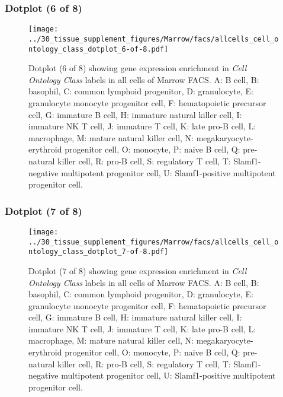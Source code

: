 \subsubsection{Dotplot (6 of 8)}
\begin{figure}[h]
\centering
\texttt{[image: ../30\_tissue\_supplement\_figures/Marrow/facs/allcells\_cell\_ontology\_class\_dotplot\_6-of-8.pdf]}

\caption{ Dotplot (6 of 8)  showing gene expression enrichment in \emph{Cell Ontology Class} labels in all cells of Marrow FACS. A: B cell, B: basophil, C: common lymphoid progenitor, D: granulocyte, E: granulocyte monocyte progenitor cell, F: hematopoietic precursor cell, G: immature B cell, H: immature natural killer cell, I: immature NK T cell, J: immature T cell, K: late pro-B cell, L: macrophage, M: mature natural killer cell, N: megakaryocyte-erythroid progenitor cell, O: monocyte, P: naive B cell, Q: pre-natural killer cell, R: pro-B cell, S: regulatory T cell, T: Slamf1-negative multipotent progenitor cell, U: Slamf1-positive multipotent progenitor cell.}
\end{figure}


\clearpage

\subsubsection{Dotplot (7 of 8)}
\begin{figure}[h]
\centering
\texttt{[image: ../30\_tissue\_supplement\_figures/Marrow/facs/allcells\_cell\_ontology\_class\_dotplot\_7-of-8.pdf]}

\caption{ Dotplot (7 of 8)  showing gene expression enrichment in \emph{Cell Ontology Class} labels in all cells of Marrow FACS. A: B cell, B: basophil, C: common lymphoid progenitor, D: granulocyte, E: granulocyte monocyte progenitor cell, F: hematopoietic precursor cell, G: immature B cell, H: immature natural killer cell, I: immature NK T cell, J: immature T cell, K: late pro-B cell, L: macrophage, M: mature natural killer cell, N: megakaryocyte-erythroid progenitor cell, O: monocyte, P: naive B cell, Q: pre-natural killer cell, R: pro-B cell, S: regulatory T cell, T: Slamf1-negative multipotent progenitor cell, U: Slamf1-positive multipotent progenitor cell.}
\end{figure}


\clearpage

